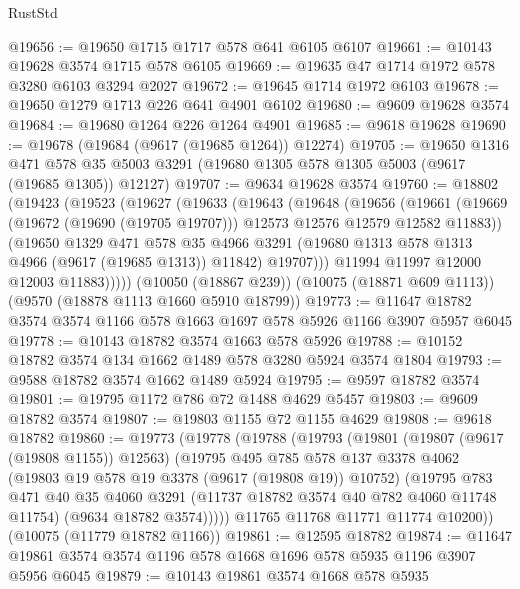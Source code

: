 \begin{lexlean}{RustStd}
\begin{coremodule}
@19656 := @19650 @1715 @1717 @578 @641 @6105 @6107
@19661 := @10143 @19628 @3574 @1715 @578 @6105
@19669 := @19635 @47 @1714 @1972 @578 @3280 @6103 @3294 @2027
@19672 := @19645 @1714 @1972 @6103
@19678 := @19650 @1279 @1713 @226 @641 @4901 @6102
@19680 := @9609 @19628 @3574
@19684 := @19680 @1264 @226 @1264 @4901
@19685 := @9618 @19628
@19690 := @19678 (@19684 (@9617 (@19685 @1264)) @12274)
@19705 := @19650
    @1316
    @471
    @578
    @35
    @5003
    @3291
    (@19680 @1305 @578 @1305 @5003 (@9617 (@19685 @1305)) @12127)
@19707 := @9634 @19628 @3574
@19760 := @18802
    (@19423
      (@19523
        (@19627
          (@19633
            (@19643
              (@19648
                (@19656
                  (@19661
                    (@19669 (@19672 (@19690 (@19705 @19707))) @12573 @12576 @12579 @12582 @11883))
                  (@19650
                    @1329
                    @471
                    @578
                    @35
                    @4966
                    @3291
                    (@19680 @1313 @578 @1313 @4966 (@9617 (@19685 @1313)) @11842)
                    @19707)))
              @11994
              @11997
              @12000
              @12003
              @11883)))))
    (@10050 (@18867 @239))
    (@10075 (@18871 @609 @1113))
    (@9570 (@18878 @1113 @1660 @5910 @18799))
@19773 := @11647 @18782 @3574 @3574 @1166 @578 @1663 @1697 @578 @5926 @1166 @3907 @5957 @6045
@19778 := @10143 @18782 @3574 @1663 @578 @5926
@19788 := @10152 @18782 @3574 @134 @1662 @1489 @578 @3280 @5924 @3574 @1804
@19793 := @9588 @18782 @3574 @1662 @1489 @5924
@19795 := @9597 @18782 @3574
@19801 := @19795 @1172 @786 @72 @1488 @4629 @5457
@19803 := @9609 @18782 @3574
@19807 := @19803 @1155 @72 @1155 @4629
@19808 := @9618 @18782
@19860 := @19773
    (@19778
      (@19788
        (@19793
          (@19801
            (@19807 (@9617 (@19808 @1155)) @12563)
            (@19795
              @495
              @785
              @578
              @137
              @3378
              @4062
              (@19803 @19 @578 @19 @3378 (@9617 (@19808 @19)) @10752)
              (@19795
                @783
                @471
                @40
                @35
                @4060
                @3291
                (@11737 @18782 @3574 @40 @782 @4060 @11748 @11754)
                (@9634 @18782 @3574)))))
        @11765
        @11768
        @11771
        @11774
        @10200))
    (@10075 (@11779 @18782 @1166))
@19861 := @12595 @18782
@19874 := @11647 @19861 @3574 @3574 @1196 @578 @1668 @1696 @578 @5935 @1196 @3907 @5956 @6045
@19879 := @10143 @19861 @3574 @1668 @578 @5935

\end{coremodule}
\end{lexlean}
